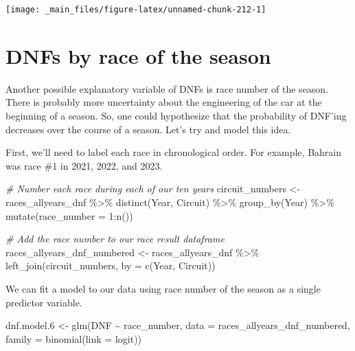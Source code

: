 \documentclass[
]{book}
\newenvironment{Shaded}{\begin{snugshade}}{\end{snugshade}}
\newcommand{\AttributeTok}[1]{\textcolor[rgb]{0.77,0.63,0.00}{#1}}
\newcommand{\CommentTok}[1]{\textcolor[rgb]{0.56,0.35,0.01}{\textit{#1}}}
\newcommand{\DecValTok}[1]{\textcolor[rgb]{0.00,0.00,0.81}{#1}}
\newcommand{\FloatTok}[1]{\textcolor[rgb]{0.00,0.00,0.81}{#1}}
\newcommand{\FunctionTok}[1]{\textcolor[rgb]{0.00,0.00,0.00}{#1}}
\newcommand{\NormalTok}[1]{#1}
\newcommand{\OtherTok}[1]{\textcolor[rgb]{0.56,0.35,0.01}{#1}}
\newcommand{\SpecialCharTok}[1]{\textcolor[rgb]{0.00,0.00,0.00}{#1}}
\newcommand{\StringTok}[1]{\textcolor[rgb]{0.31,0.60,0.02}{#1}}
\begin{document}
\begin{center}\texttt{[image: \_main\_files/figure-latex/unnamed-chunk-212-1]} \end{center}

\hypertarget{dnfs-by-race-of-the-season}{%
\section{DNFs by race of the season}\label{dnfs-by-race-of-the-season}}

Another possible explanatory variable of DNFs is race number of the season. There is probably more uncertainty about the engineering of the car at the beginning of a season. So, one could hypothesize that the probability of DNF'ing decreases over the course of a season. Let's try and model this idea.

First, we'll need to label each race in chronological order. For example, Bahrain was race \#1 in 2021, 2022, and 2023.

\begin{Shaded}
\begin{Highlighting}[]
\CommentTok{\# Number each race during each of our ten years}
\NormalTok{circuit\_numbers }\OtherTok{\textless{}{-}}\NormalTok{ races\_allyears\_dnf }\SpecialCharTok{\%\textgreater{}\%} 
  \FunctionTok{distinct}\NormalTok{(Year, Circuit) }\SpecialCharTok{\%\textgreater{}\%}
  \FunctionTok{group\_by}\NormalTok{(Year) }\SpecialCharTok{\%\textgreater{}\%} 
  \FunctionTok{mutate}\NormalTok{(}\AttributeTok{race\_number =} \DecValTok{1}\SpecialCharTok{:}\FunctionTok{n}\NormalTok{())}

\CommentTok{\# Add the race number to our race result dataframe}
\NormalTok{races\_allyears\_dnf\_numbered }\OtherTok{\textless{}{-}}\NormalTok{ races\_allyears\_dnf }\SpecialCharTok{\%\textgreater{}\%}
  \FunctionTok{left\_join}\NormalTok{(circuit\_numbers, }\AttributeTok{by =} \FunctionTok{c}\NormalTok{(}\StringTok{\textquotesingle{}Year\textquotesingle{}}\NormalTok{, }\StringTok{\textquotesingle{}Circuit\textquotesingle{}}\NormalTok{))}
\end{Highlighting}
\end{Shaded}

We can fit a model to our data using race number of the season as a single predictor variable.

\begin{Shaded}
\begin{Highlighting}[]
\NormalTok{dnf.model}\FloatTok{.6} \OtherTok{\textless{}{-}} \FunctionTok{glm}\NormalTok{(DNF }\SpecialCharTok{\textasciitilde{}}\NormalTok{ race\_number, }\AttributeTok{data =}\NormalTok{ races\_allyears\_dnf\_numbered,}
                   \AttributeTok{family =} \FunctionTok{binomial}\NormalTok{(}\AttributeTok{link =} \StringTok{\textquotesingle{}logit\textquotesingle{}}\NormalTok{))}
\end{Highlighting}
\end{Shaded}
\end{document}
